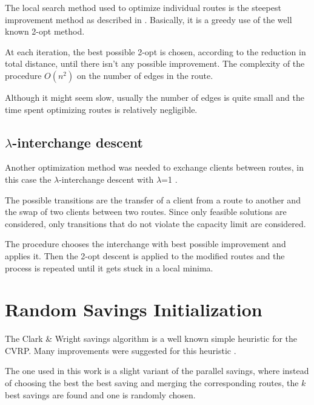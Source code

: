 \documentclass{article} %
\begin{document}
The local search method used to optimize individual routes is the steepest improvement method as described in \citep{steepest_improvement}.
Basically, it is a greedy use of the well known 2-opt method.\newline

At each iteration, the best possible 2-opt is chosen, according to the reduction in total distance, until there isn't any possible improvement. The complexity of the procedure $O(n^{2})$ on the number of edges in the route.\newline

Although it might seem slow, usually the number of edges is quite small and the time spent optimizing routes is relatively negligible.\newline



\subsection{$\lambda$-interchange descent}
\label{local_cluster}
Another optimization method was needed to exchange clients between routes, in this case the $\lambda$-interchange descent with $\lambda$=1 \citep{osman1993}.\newline

The possible transitions are the transfer of a client from a route to another and the swap of two clients between two routes. Since only feasible solutions are considered, only transitions that do not violate the capacity limit are considered.\newline

The procedure chooses the interchange with best possible improvement and applies it. Then the 2-opt descent is applied to the modified routes and the process is repeated until it gets stuck in a local minima.


\newpage
\section{Random Savings Initialization}
\label{random_savings}
The Clark \& Wright savings algorithm is a well known simple heuristic for the CVRP.
Many improvements were suggested for this heuristic \cite{clark_wright_ds}.\newline

The one used in this work is a slight variant of the parallel savings, where instead of choosing the best the best saving and merging the corresponding routes, the $k$ best savings are found and one is randomly chosen.\newline
\end{document}
